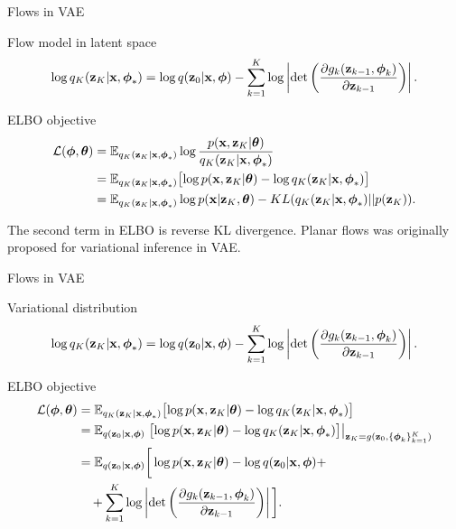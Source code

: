 \begin{frame}{Flows in VAE}
\begin{block}{Flow model in latent space}
	\vspace{-0.7cm}
	\[
	\log q_K(\mathbf{z}_K | \mathbf{x}, \boldsymbol{\phi}_*) = \log q(\mathbf{z}_0 | \mathbf{x}, \boldsymbol{\phi}) - \sum_{k=1}^K \log \left| \det \left( \frac{\partial g_k(\mathbf{z}_{k - 1}, \boldsymbol{\phi}_k)}{\partial \mathbf{z}_{k-1}} \right) \right|.
	\]
	\vspace{-0.5cm}
\end{block}
\begin{block}{ELBO objective}
	\vspace{-0.5cm}
	\begin{align*}
		\mathcal{L} (\boldsymbol{\phi}, \boldsymbol{\theta})  &= \mathbb{E}_{q_K(\mathbf{z}_K | \mathbf{x}, \boldsymbol{\phi}_*)} \log \frac{p(\mathbf{x}, \mathbf{z}_K | \boldsymbol{\theta})}{q_K(\mathbf{z}_K| \mathbf{x}, \boldsymbol{\phi}_*)} \\
		&= \mathbb{E}_{q_K(\mathbf{z}_K | \mathbf{x}, \boldsymbol{\phi}_*)} \bigl[\log p(\mathbf{x}, \mathbf{z}_K | \boldsymbol{\theta}) - \log q_K(\mathbf{z}_K| \mathbf{x}, \boldsymbol{\phi}_*) \bigr] \\ 
		&=  \mathbb{E}_{q_K(\mathbf{z}_K | \mathbf{x}, \boldsymbol{\phi}_*)} \log p(\mathbf{x} | \mathbf{z}_K, \boldsymbol{\theta}) - KL (q_K(\mathbf{z}_K| \mathbf{x}, \boldsymbol{\phi}_*) || p(\mathbf{z}_K)).
	\end{align*}
\end{block}
The second term in ELBO is reverse KL divergence. Planar flows was originally proposed for variational inference in VAE.
\end{frame}
\begin{frame}{Flows in VAE}
\begin{block}{Variational distribution}
	\vspace{-0.5cm}
	\[
	\log q_K(\mathbf{z}_K | \mathbf{x}, \boldsymbol{\phi}_*) = \log q(\mathbf{z}_0 | \mathbf{x}, \boldsymbol{\phi}) - \sum_{k=1}^K \log \left| \det \left( \frac{\partial g_k(\mathbf{z}_{k - 1}, \boldsymbol{\phi}_k)}{\partial \mathbf{z}_{k-1}} \right) \right|.
	\]
	\vspace{-0.5cm}
\end{block}
\begin{block}{ELBO objective}
	\vspace{-0.5cm}
	\begin{align*}
		\mathcal{L} (\boldsymbol{\phi}, \boldsymbol{\theta}) 
		&= \mathbb{E}_{q_K(\mathbf{z}_K | \mathbf{x}, \boldsymbol{\phi}_*)} \bigl[\log p(\mathbf{x}, \mathbf{z}_K | \boldsymbol{\theta}) - \log q_K(\mathbf{z}_K| \mathbf{x}, \boldsymbol{\phi}_*) \bigr] \\
		&= \mathbb{E}_{q(\mathbf{z}_0 | \mathbf{x}, \boldsymbol{\phi})} \left. \bigl[\log p(\mathbf{x}, \mathbf{z}_K | \boldsymbol{\theta}) - \log q_K(\mathbf{z}_K| \mathbf{x}, \boldsymbol{\phi}_*) \bigr]\right|_{\mathbf{z}_K = g(\mathbf{z}_0, \{\boldsymbol{\phi}_k\}_{k=1}^K)} \\
		&= \mathbb{E}_{q(\mathbf{z}_0 | \mathbf{x}, \boldsymbol{\phi})} \bigg[\log p(\mathbf{x}, \mathbf{z}_K | \boldsymbol{\theta}) -  \log q(\mathbf{z}_0 | \mathbf{x}, \boldsymbol{\phi} ) + \\ & \quad  + \sum_{k=1}^K \log \left| \det \left( \frac{\partial g_k(\mathbf{z}_{k - 1}, \boldsymbol{\phi}_k)}{\partial \mathbf{z}_{k-1}} \right) \right| \bigg].
	\end{align*}
\end{block}
\end{frame}
